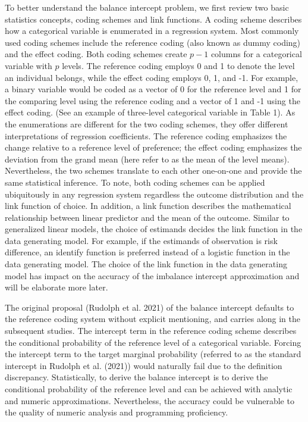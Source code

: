 \documentclass[
]{article}
\begin{document}
To better understand the balance intercept problem, we first review two
basic statistics concepts, coding schemes and link functions. A coding
scheme describes how a categorical variable is enumerated in a
regression system. Most commonly used coding schemes include the
reference coding (also known as dummy coding) and the effect coding.
Both coding schemes create \(p-1\) columns for a categorical variable
with \(p\) levels. The reference coding employs 0 and 1 to denote the
level an individual belongs, while the effect coding employs 0, 1, and
-1. For example, a binary variable would be coded as a vector of 0 for
the reference level and 1 for the comparing level using the reference
coding and a vector of 1 and -1 using the effect coding. (See an example
of three-level categorical variable in Table 1). As the enumerations are
different for the two coding schemes, they offer different
interpretations of regression coefficients. The reference coding
emphasizes the change relative to a reference level of preference; the
effect coding emphasizes the deviation from the grand mean (here refer
to as the mean of the level means). Nevertheless, the two schemes
translate to each other one-on-one and provide the same statistical
inference. To note, both coding schemes can be applied ubiquitously in
any regression system regardless the outcome distribution and the link
function of choice. In addition, a link function describes the
mathematical relationship between linear predictor and the mean of the
outcome. Similar to generalized linear models, the choice of estimands
decides the link function in the data generating model. For example, if
the estimands of observation is risk difference, an identify function is
preferred instead of a logistic function in the data generating model.
The choice of the link function in the data generating model has impact
on the accuracy of the imbalance intercept approximation and will be
elaborate more later.

The original proposal (Rudolph et al. 2021) of the balance intercept
defaults to the reference coding system without explicit mentioning, and
carries along in the subsequent studies. The intercept term in the
reference coding scheme describes the conditional probability of the
reference level of a categorical variable. Forcing the intercept term to
the target marginal probability (referred to as the standard intercept
in Rudolph et al. (2021)) would naturally fail due to the definition
discrepancy. Statistically, to derive the balance intercept is to derive
the conditional probability of the reference level and can be achieved
with analytic and numeric approximations. Nevertheless, the accuracy
could be vulnerable to the quality of numeric analysis and programming
proficiency.
\end{document}
